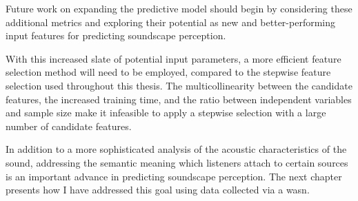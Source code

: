 Future work on expanding the predictive model should begin by considering these additional metrics and exploring their potential as new and better-performing input features for predicting soundscape perception.

With this increased slate of potential input parameters, a more efficient feature selection method will need to be employed, compared to the stepwise feature selection used throughout this thesis. The multicollinearity between the candidate features, the increased training time, and the ratio between independent variables and sample size make it infeasible to apply a stepwise selection with a large number of candidate features. 

In addition to a more sophisticated analysis of the acoustic characteristics of the sound, addressing the semantic meaning which listeners attach to certain sources is an important advance in predicting soundscape perception. The next chapter presents how I have addressed this goal using data collected via a \gls{wasn}.